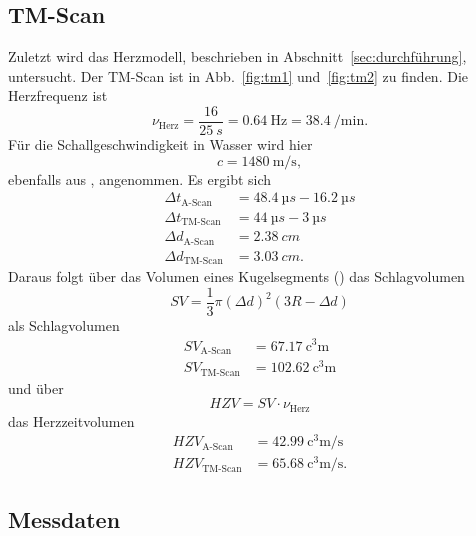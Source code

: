 \subsection{TM-Scan}
Zuletzt wird das Herzmodell, beschrieben in Abschnitt~\ref{sec:durchführung}, untersucht. Der TM-Scan ist in Abb.~\ref{fig:tm1} und~\ref{fig:tm2} zu finden. Die Herzfrequenz ist
\begin{equation}
  \nu_\text{Herz} = \frac{16}{\SI{25}{s}} = \SI{0.64}{\hertz} = \SI{38.4}{\per\minute}.
\end{equation}
Für die Schallgeschwindigkeit in Wasser wird hier
\begin{equation}
  c = \SI{1480}{\meter\per\second},
\end{equation}
ebenfalls aus \cite{olympus}, angenommen.
Es ergibt sich
\begin{align*}
  \Delta t_\text{A-Scan} &= \SI{48.4}{µs} - \SI{16.2}{µs} \\
  \Delta t_\text{TM-Scan} &= \SI{44}{µs} - \SI{3}{µs} \\
  \Delta d_\text{A-Scan} &= \SI{2.38}{cm} \\
  \Delta d_\text{TM-Scan} &= \SI{3.03}{cm}.
\end{align*}
Daraus folgt über das Volumen eines Kugelsegments (\cite{wurst}) das Schlagvolumen
\begin{equation}
  SV = \frac{1}{3} \pi (\Delta d)^2 (3R - \Delta d)
\end{equation}
als Schlagvolumen
\begin{align*}
  SV_\text{A-Scan} &= \SI{67.17}{\cubic\centi\meter} \\
  SV_\text{TM-Scan} &= \SI{102.62}{\cubic\centi\meter}
\end{align*}
und über
\begin{equation}
  HZV = SV \cdot \nu_\text{Herz}
\end{equation}
das Herzzeitvolumen
\begin{align*}
  HZV_\text{A-Scan} &= \SI{42.99}{\cubic\centi\meter\per\second} \\
  HZV_\text{TM-Scan} &= \SI{65.68}{\cubic\centi\meter\per\second}.
\end{align*}

\FloatBarrier
\subsection{Messdaten}


